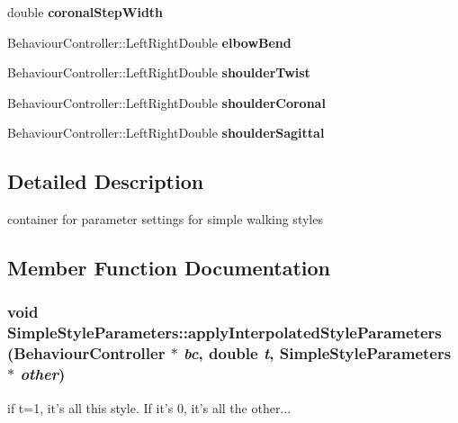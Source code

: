 \begin{DoxyCompactItemize}
\item 
\hypertarget{classCartWheel_1_1Core_1_1SimpleStyleParameters_af1b4c4a10e7217380288968d7c4fef20}{
double {\bfseries coronalStepWidth}}
\label{classCartWheel_1_1Core_1_1SimpleStyleParameters_af1b4c4a10e7217380288968d7c4fef20}

\item 
\hypertarget{classCartWheel_1_1Core_1_1SimpleStyleParameters_a3e12f634c533c94de90f03f5ae27f7a3}{
BehaviourController::LeftRightDouble {\bfseries elbowBend}}
\label{classCartWheel_1_1Core_1_1SimpleStyleParameters_a3e12f634c533c94de90f03f5ae27f7a3}

\item 
\hypertarget{classCartWheel_1_1Core_1_1SimpleStyleParameters_a82e7a970c8a5a9a2d598c84acf73bb8b}{
BehaviourController::LeftRightDouble {\bfseries shoulderTwist}}
\label{classCartWheel_1_1Core_1_1SimpleStyleParameters_a82e7a970c8a5a9a2d598c84acf73bb8b}

\item 
\hypertarget{classCartWheel_1_1Core_1_1SimpleStyleParameters_a688a78810486ce12dd2fe82481ea8873}{
BehaviourController::LeftRightDouble {\bfseries shoulderCoronal}}
\label{classCartWheel_1_1Core_1_1SimpleStyleParameters_a688a78810486ce12dd2fe82481ea8873}

\item 
\hypertarget{classCartWheel_1_1Core_1_1SimpleStyleParameters_a6dbaa1487c23e7440b3c4757765c9bc4}{
BehaviourController::LeftRightDouble {\bfseries shoulderSagittal}}
\label{classCartWheel_1_1Core_1_1SimpleStyleParameters_a6dbaa1487c23e7440b3c4757765c9bc4}

\end{DoxyCompactItemize}


\subsection{Detailed Description}
container for parameter settings for simple walking styles 

\subsection{Member Function Documentation}
\hypertarget{classCartWheel_1_1Core_1_1SimpleStyleParameters_a48b321516cf94a37ca25e6bd2b5a3ac2}{
\subsubsection[{applyInterpolatedStyleParameters}]{\setlength{\rightskip}{0pt plus 5cm}void SimpleStyleParameters::applyInterpolatedStyleParameters ({\bf BehaviourController} $\ast$ {\em bc}, \/  double {\em t}, \/  {\bf SimpleStyleParameters} $\ast$ {\em other})}}
\label{classCartWheel_1_1Core_1_1SimpleStyleParameters_a48b321516cf94a37ca25e6bd2b5a3ac2}
if t=1, it's all this style. If it's 0, it's all the other... 

